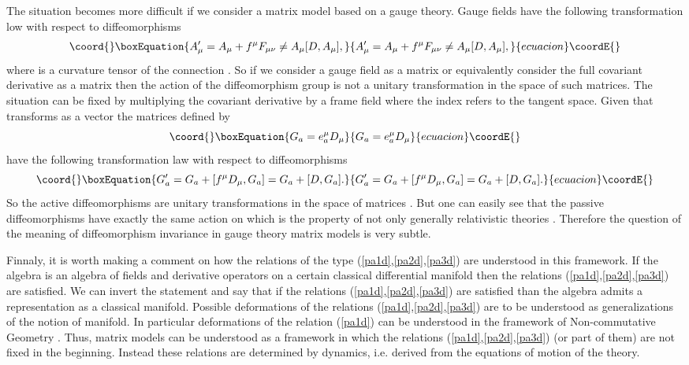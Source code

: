 \documentclass[a4paper,11pt]{article}
\begin{document}
The situation becomes more difficult if we consider a matrix model
based on a gauge theory. Gauge fields have the following
transformation low with respect to diffeomorphisms
\begin{equation}\coord{}\boxEquation{
A_\mu'=A_\mu +f^\mu F_{\mu \nu} \not=A_\mu [D,A_\mu],
}{
A_\mu'=A_\mu +f^\mu F_{\mu \nu} \not=A_\mu [D,A_\mu],
}{ecuacion}\coordE{}\end{equation}
where \coordHE{} is a curvature tensor of the connection
\coordHE{}. So if we consider a gauge field \coordHE{} as a matrix or
equivalently consider the full covariant derivative
\coordHE{} as a matrix then the action of the
diffeomorphism group is not a unitary transformation in the space
of such matrices. The situation can be fixed by multiplying the
covariant derivative by a frame field \coordHE{} where the index
\coordHE{} refers to the tangent space. Given that \coordHE{} transforms
as a vector the matrices \coordHE{} defined by
\begin{equation}\coord{}\boxEquation{
G_a=e^\mu_a D_\mu
}{
G_a=e^\mu_a D_\mu
}{ecuacion}\coordE{}\end{equation}
have the following transformation law with respect to
diffeomorphisms
\begin{equation}\coord{}\boxEquation{
G_a'=G_a+[f^\mu D_\mu, G_a]=G_a+[D,G_a].
}{
G_a'=G_a+[f^\mu D_\mu, G_a]=G_a+[D,G_a].
}{ecuacion}\coordE{}\end{equation}
So the active diffeomorphisms are unitary transformations in the
space of matrices \coordHE{}. But one can easily see that the passive
diffeomorphisms have exactly the same action on \coordHE{} which is the
property of not only generally relativistic theories . Therefore
the question of the meaning of diffeomorphism invariance in gauge
theory matrix models is very subtle.

Finnaly, it is worth making a comment on how the relations of the
type (\ref{pa1d},\ref{pa2d},\ref{pa3d}) are understood in this
framework. If the algebra \coordHE{} is an
algebra of fields and derivative operators on a certain classical
differential manifold then the relations
(\ref{pa1d},\ref{pa2d},\ref{pa3d}) are satisfied.  We can invert
the statement and say that if the relations
(\ref{pa1d},\ref{pa2d},\ref{pa3d}) are satisfied than the algebra
\coordHE{} admits a representation as a classical manifold.
Possible deformations of the relations
(\ref{pa1d},\ref{pa2d},\ref{pa3d}) are to be understood as
generalizations of the notion of manifold. In particular
deformations of the relation (\ref{pa1d}) can be understood in the
framework of Non-commutative Geometry \cite{connes}. Thus, matrix
models can be understood as a framework in which the relations
(\ref{pa1d},\ref{pa2d},\ref{pa3d}) (or part of them) are not fixed
in the beginning. Instead  these relations  are determined by
dynamics, i.e. derived from the equations of motion of the theory.
\end{document}
